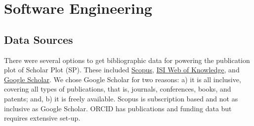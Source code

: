 






















\chapter{Software Engineering}\label{chap:Software Engineering}

\section{Data Sources}
There were several options to get bibliographic data for powering the publication plot of Scholar Plot (SP). These included \href{http://www.scopus.com/}{Scopus}, \href{http://www.isiknowledge.com/}{ISI Web of Knowledge}, and \href{http://scholar.google.com}{Google Scholar}. We chose Google Scholar for two reasons: a) it is all inclusive, covering all types of publications, that is, journals, conferences, books, and patents; and, b) it is freely available. Scopus is subscription based and not as inclusive as Google Scholar. ORCID has publications and funding data but requires extensive set-up.

